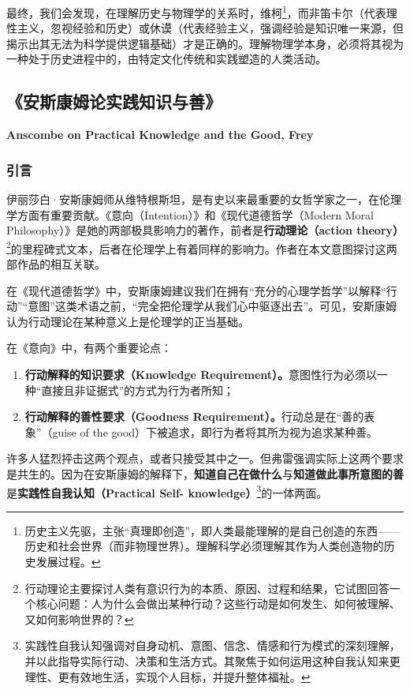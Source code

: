 \documentclass[12pt, a4paper, oneside]{ctexart}
\renewcommand{\b}{\textbf}
\newcommand{\f}{\footnote}
\begin{document}
最终，我们会发现，在理解历史与物理学的关系时，维柯\f{历史主义先驱，主张“真理即创造”，即人类最能理解的是自己创造的东西——历史和社会世界（而非物理世界）。理解科学必须理解其作为人类创造物的历史发展过程。}，而非笛卡尔（代表理性主义，忽视经验和历史）或休谟（代表经验主义，强调经验是知识唯一来源，但揭示出其无法为科学提供逻辑基础）才是正确的。理解物理学本身，必须将其视为一种处于历史进程中的，由特定文化传统和实践塑造的人类活动。

\subsection{《安斯康姆论实践知识与善》}
\textbf{Anscombe on Practical Knowledge and the Good, Frey}
\subsubsection{引言}
伊丽莎白·安斯康姆师从维特根斯坦，是有史以来最重要的女哲学家之一，在伦理学方面有重要贡献。《意向（Intention）》和《现代道德哲学（Modern Moral Philosophy）》是她的两部极具影响力的著作，前者是\b{行动理论（action theory）}\f{行动理论主要探讨人类有意识行为的本质、原因、过程和结果，它试图回答一个核心问题：人为什么会做出某种行动？这些行动是如何发生、如何被理解、又如何影响世界的？}的里程碑式文本，后者在伦理学上有着同样的影响力。作者在本文意图探讨这两部作品的相互关联。

在《现代道德哲学》中，安斯康姆建议我们在拥有“充分的心理学哲学”以解释“行动”“意图”这类术语之前，“完全把伦理学从我们心中驱逐出去”。可见，安斯康姆认为行动理论在某种意义上是伦理学的正当基础。

在《意向》中，有两个重要论点：
\begin{enumerate}
    \item \b{行动解释的知识要求（Knowledge Requirement）。}意图性行为必须以一种“直接且非证据式”的方式为行为者所知；
    \item \b{行动解释的善性要求（Goodness Requirement）。}行动总是在“善的表象”（guise of the good）下被追求，即行为者将其所为视为追求某种善。
\end{enumerate}

许多人猛烈抨击这两个观点，或者只接受其中之一。但弗雷强调实际上这两个要求是共生的。因为在安斯康姆的解释下，\b{知道自己在做什么}与\b{知道做此事所意图的善}是\b{实践性自我认知（Practical Self- 
knowledge）}\f{实践性自我认知强调对自身动机、意图、信念、情感和行为模式的深刻理解，并以此指导实际行动、决策和生活方式。其聚焦于如何运用这种自我认知来更理性、更有效地生活，实现个人目标，并提升整体福祉。}的一体两面。
\end{document}
